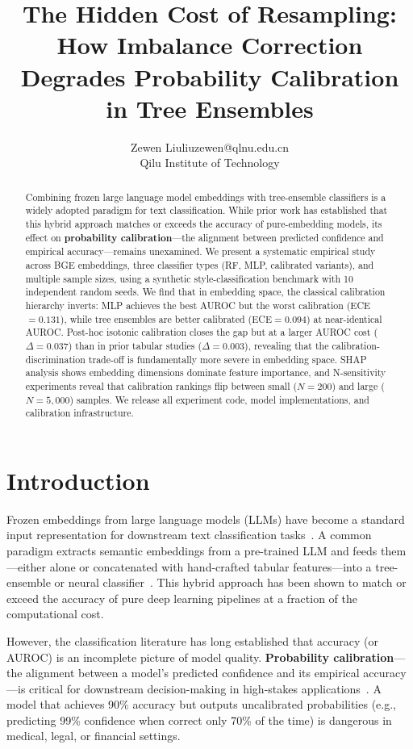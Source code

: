 \documentclass[11pt]{article}
\title{The Hidden Cost of Resampling: How Imbalance Correction Degrades Probability Calibration in Tree Ensembles}
\author{\name Zewen Liu\email liuzewen@qlnu.edu.cn\\\addr Qilu Institute of Technology}  %
\date{}
\begin{document}
\maketitle

\begin{abstract}
Combining frozen large language model embeddings with tree-ensemble classifiers is a widely adopted paradigm for text classification. While prior work has established that this hybrid approach matches or exceeds the accuracy of pure-embedding models, its effect on \textbf{probability calibration}---the alignment between predicted confidence and empirical accuracy---remains unexamined. We present a systematic empirical study across BGE embeddings, three classifier types (RF, MLP, calibrated variants), and multiple sample sizes, using a synthetic style-classification benchmark with 10 independent random seeds. We find that in embedding space, the classical calibration hierarchy inverts: MLP achieves the best AUROC but the worst calibration (ECE${=}0.131$), while tree ensembles are better calibrated (ECE${=}0.094$) at near-identical AUROC. Post-hoc isotonic calibration closes the gap but at a larger AUROC cost ($\Delta{=}0.037$) than in prior tabular studies ($\Delta{=}0.003$), revealing that the calibration-discrimination trade-off is fundamentally more severe in embedding space. SHAP analysis shows embedding dimensions dominate feature importance, and N-sensitivity experiments reveal that calibration rankings flip between small ($N{=}200$) and large ($N{=}5{,}000$) samples. We release all experiment code, model implementations, and calibration infrastructure.
\end{abstract}

\section{Introduction}

Frozen embeddings from large language models (LLMs) have become a standard input representation for downstream text classification tasks~\cite{reimers2019sentence,devlin2019bert}. A common paradigm extracts semantic embeddings from a pre-trained LLM and feeds them---either alone or concatenated with hand-crafted tabular features---into a tree-ensemble or neural classifier~\cite{grinsztajn2022tree}. This hybrid approach has been shown to match or exceed the accuracy of pure deep learning pipelines at a fraction of the computational cost.

However, the classification literature has long established that accuracy (or AUROC) is an incomplete picture of model quality. \textbf{Probability calibration}---the alignment between a model's predicted confidence and its empirical accuracy---is critical for downstream decision-making in high-stakes applications~\cite{guo2017calibration,niculescu2005predicting}. A model that achieves 90\% accuracy but outputs uncalibrated probabilities (e.g., predicting 99\% confidence when correct only 70\% of the time) is dangerous in medical, legal, or financial settings.
\end{document}

